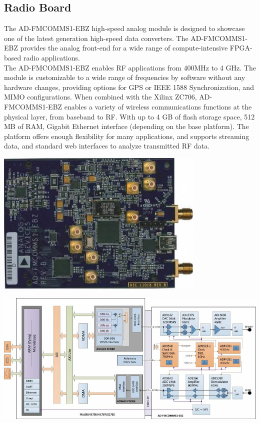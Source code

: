 \subsection{Radio Board}

The AD-FMCOMMS1-EBZ high-speed analog module is designed to showcase one of the latest generation high-speed data converters. The AD-FMCOMMS1-EBZ provides the analog front-end for a wide range of compute-intensive FPGA-based radio applications.\\
The AD-FMCOMMS1-EBZ enables RF applications from 400MHz to 4 GHz. The module is customizable to a wide range of frequencies by software without any hardware changes, providing options for GPS or IEEE 1588 Synchronization, and MIMO configurations. When combined with the Xilinx ZC706, AD-FMCOMMS1-EBZ enables a variety of wireless communications functions at the physical layer, from baseband to RF. With up to 4 GB of flash storage space, 512 MB of RAM, Gigabit Ethernet interface (depending on the base platform). The platform offers enough flexibility for many applications, and supports streaming data, and standard web interfaces to analyze transmitted RF data.\\

\begin{center}
\includegraphics[width=10cm]{content/fig/fmcomms1.jpg}
\end{center}

\begin{center}
\includegraphics[width=15cm]{content/fig/fmcomms1Blockdiagram.jpg}
\end{center}

